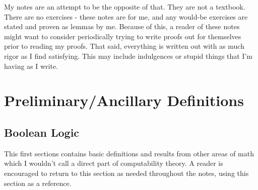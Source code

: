 \documentclass{article}
\theoremstyle{definition}
\theoremstyle{plain}
\theoremstyle{theorem}
\begin{document}
	\par My notes are an attempt to be the opposite of that. They are not a textbook. There are no exercises - these notes are for me, and any would-be exercises are stated and proven as lemmas by me. Because of this, a reader of these notes might want to consider periodically trying to write proofs out for themselves prior to reading my proofs. That said, everything is written out with as much rigor as I find satisfying. This may include indulgences or stupid things that I'm having as I write. 
\fi
\section{Preliminary/Ancillary Definitions}
\subsection{Boolean Logic}
This first sections contains basic definitions and results from other areas of math which I wouldn't call a direct part of computability theory. A reader is encouraged to return to this section as needed throughout the notes, using this section as a reference.
\end{document}
